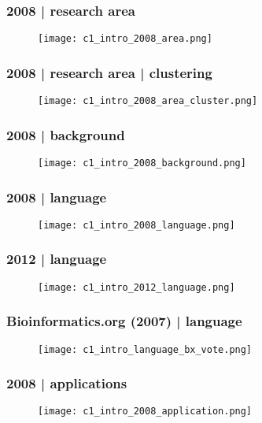 \begin{frame}
  \frametitle{2008 | research area}
   \begin{figure}
     \centering
     \texttt{[image: c1\_intro\_2008\_area.png]}
   \end{figure}
\end{frame}

\begin{frame}
  \frametitle{2008 | research area | clustering}
   \begin{figure}
     \centering
     \texttt{[image: c1\_intro\_2008\_area\_cluster.png]}
   \end{figure}
\end{frame}

\begin{frame}
  \frametitle{2008 | background}
   \begin{figure}
     \centering
     \texttt{[image: c1\_intro\_2008\_background.png]}
   \end{figure}
\end{frame}

\begin{frame}
  \frametitle{2008 | language}
   \begin{figure}
     \centering
     \texttt{[image: c1\_intro\_2008\_language.png]}
   \end{figure}
\end{frame}

\begin{frame}
  \frametitle{2012 | language}
   \begin{figure}
     \centering
     \texttt{[image: c1\_intro\_2012\_language.png]}
   \end{figure}
\end{frame}

\begin{frame}
  \frametitle{Bioinformatics.org (2007) | language}
   \begin{figure}
     \centering
     \texttt{[image: c1\_intro\_language\_bx\_vote.png]}
   \end{figure}
\end{frame}


\begin{frame}
  \frametitle{2008 | applications}
   \begin{figure}
     \centering
     \texttt{[image: c1\_intro\_2008\_application.png]}
   \end{figure}
\end{frame}

